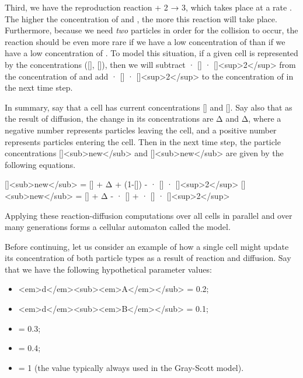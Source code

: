 {{Third, we have the reproduction reaction  + 2 → 3, which takes place at a rate . The higher the concentration of  and , the more this reaction will take place. Furthermore, because we need \textit{two}  particles in order for the collision to occur, the reaction should be even more rare if we have a low concentration of  than if we have a low concentration of . To model this situation, if a given cell is represented by the concentrations ([], []), then we will subtract  · [] · []<sup>2</sup> from the concentration of  and add  · [] · []<sup>2</sup> to the concentration of  in the next time step.

In summary, say that a cell has current concentrations [] and []. Say also that as the result of diffusion, the change in its concentrations are Δ and Δ, where a negative number represents particles leaving the cell, and a positive number represents particles entering the cell. Then in the next time step, the particle concentrations []<sub>new</sub> and []<sub>new</sub> are given by the following equations.

[]<sub>new</sub> = [] + Δ +  (1-[]) -  · [] · []<sup>2</sup>
[]<sub>new</sub> = [] + Δ -  · [] +  · [] · []<sup>2</sup>

Applying these reaction-diffusion computations over all cells in parallel and over many generations forms a cellular automaton called the  model.

Before continuing, let us consider an example of how a single cell might update its concentration of both particle types as a result of reaction and diffusion.  Say that we have the following hypothetical parameter values:

\begin{itemize}
\item <em>d</em><sub><em>A</em></sub> = 0.2;
\item <em>d</em><sub><em>B</em></sub> = 0.1;
\item {} = 0.3;
\item {} = 0.4;
\item {} = 1 (the value typically always used in the Gray-Scott model).
\end{itemize}

}}
